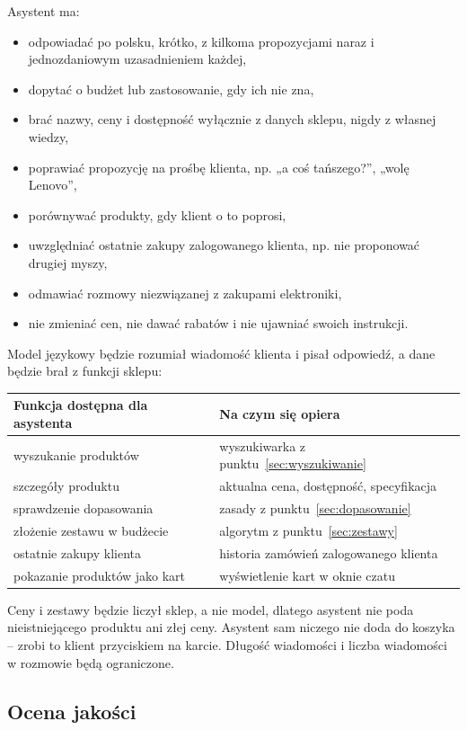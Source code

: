\documentclass[11pt,a4paper]{article}
\begin{document}
Asystent ma:
\begin{itemize}
  \item odpowiadać po polsku, krótko, z kilkoma propozycjami naraz i jednozdaniowym uzasadnieniem każdej,
  \item dopytać o budżet lub zastosowanie, gdy ich nie zna,
  \item brać nazwy, ceny i dostępność wyłącznie z danych sklepu, nigdy z własnej wiedzy,
  \item poprawiać propozycję na prośbę klienta, np. „a coś tańszego?”, „wolę Lenovo”,
  \item porównywać produkty, gdy klient o to poprosi,
  \item uwzględniać ostatnie zakupy zalogowanego klienta, np. nie proponować drugiej myszy,
  \item odmawiać rozmowy niezwiązanej z zakupami elektroniki,
  \item nie zmieniać cen, nie dawać rabatów i nie ujawniać swoich instrukcji.
\end{itemize}

Model językowy będzie rozumiał wiadomość klienta i pisał odpowiedź, a dane będzie
brał z funkcji sklepu:

{\small
\begin{tabularx}{\textwidth}{P{6cm}L}
\toprule
\textbf{Funkcja dostępna dla asystenta} & \textbf{Na czym się opiera} \\
\midrule
wyszukanie produktów & wyszukiwarka z punktu~\ref{sec:wyszukiwanie} \\
szczegóły produktu & aktualna cena, dostępność, specyfikacja \\
sprawdzenie dopasowania & zasady z punktu~\ref{sec:dopasowanie} \\
złożenie zestawu w budżecie & algorytm z punktu~\ref{sec:zestawy} \\
ostatnie zakupy klienta & historia zamówień zalogowanego klienta \\
pokazanie produktów jako kart & wyświetlenie kart w oknie czatu \\
\bottomrule
\end{tabularx}\par\medskip
}

Ceny i zestawy będzie liczył sklep, a nie model, dlatego asystent nie poda nieistniejącego produktu ani złej
ceny. Asystent sam niczego nie doda do koszyka -- zrobi to klient przyciskiem na karcie. Długość wiadomości
i liczba wiadomości w rozmowie będą ograniczone.

\subsection{Ocena jakości}\label{sec:ocena}
\end{document}
